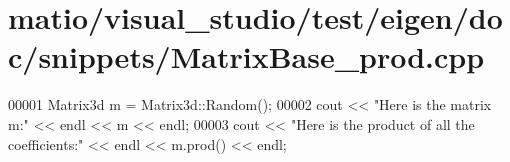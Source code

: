 \hypertarget{matio_2visual__studio_2test_2eigen_2doc_2snippets_2_matrix_base__prod_8cpp_source}{}\section{matio/visual\+\_\+studio/test/eigen/doc/snippets/\+Matrix\+Base\+\_\+prod.cpp}
\label{matio_2visual__studio_2test_2eigen_2doc_2snippets_2_matrix_base__prod_8cpp_source}

\begin{DoxyCode}
00001 Matrix3d m = Matrix3d::Random();
00002 cout << \textcolor{stringliteral}{"Here is the matrix m:"} << endl << m << endl;
00003 cout << \textcolor{stringliteral}{"Here is the product of all the coefficients:"} << endl << m.prod() << endl;
\end{DoxyCode}
